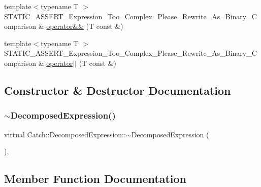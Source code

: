 \begin{DoxyCompactItemize}
\item 
{\footnotesize template$<$typename T $>$ }\\S\+T\+A\+T\+I\+C\+\_\+\+A\+S\+S\+E\+R\+T\+\_\+\+Expression\+\_\+\+Too\+\_\+\+Complex\+\_\+\+Please\+\_\+\+Rewrite\+\_\+\+As\+\_\+\+Binary\+\_\+\+Comparison \& \mbox{\hyperlink{struct_catch_1_1_decomposed_expression_a14d913535796145b39101a16c0c490da}{operator\&\&}} (T const \&)
\item 
{\footnotesize template$<$typename T $>$ }\\S\+T\+A\+T\+I\+C\+\_\+\+A\+S\+S\+E\+R\+T\+\_\+\+Expression\+\_\+\+Too\+\_\+\+Complex\+\_\+\+Please\+\_\+\+Rewrite\+\_\+\+As\+\_\+\+Binary\+\_\+\+Comparison \& \mbox{\hyperlink{struct_catch_1_1_decomposed_expression_ab4800d277290088fea9c594cfdd4f1c7}{operator$\vert$$\vert$}} (T const \&)
\end{DoxyCompactItemize}


\subsection{Constructor \& Destructor Documentation}
\mbox{\label{struct_catch_1_1_decomposed_expression_aa627c69bd83582c33a4d4dcac403936c}} 
\subsubsection{\texorpdfstring{$\sim$\+Decomposed\+Expression()}{~DecomposedExpression()}}
{\footnotesize\ttfamily virtual Catch\+::\+Decomposed\+Expression\+::$\sim$\+Decomposed\+Expression (\begin{DoxyParamCaption}{ }\end{DoxyParamCaption})\hspace{0.3cm}{\ttfamily [inline]}, {\ttfamily [virtual]}}



\subsection{Member Function Documentation}
\mbox{\label{struct_catch_1_1_decomposed_expression_a1c458ece47b71f093290dbdf9bb31fdb}} 
